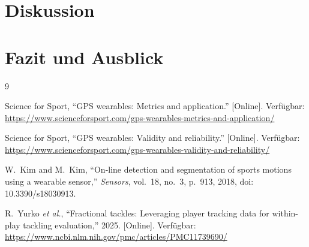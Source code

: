 \documentclass[journal]{IEEEtran}
\begin{document}

\section{Diskussion}


\section{Fazit und Ausblick}


\begin{thebibliography}{9}

Science for Sport, ``GPS wearables: Metrics and application.''
[Online]. Verfügbar: \url{https://www.scienceforsport.com/gps-wearables-metrics-and-application/}

Science for Sport, ``GPS wearables: Validity and reliability.''
[Online]. Verfügbar: \url{https://www.scienceforsport.com/gps-wearables-validity-and-reliability/}

W.~Kim and M.~Kim, ``On-line detection and segmentation of sports motions using a
wearable sensor,'' \textit{Sensors}, vol.~18, no.~3, p.~913, 2018,
doi: 10.3390/s18030913.

R.~Yurko \textit{et al.}, ``Fractional tackles: Leveraging player tracking data for
within-play tackling evaluation,'' 2025. [Online]. Verfügbar:
\url{https://www.ncbi.nlm.nih.gov/pmc/articles/PMC11739690/}

\end{thebibliography}
\end{document}
